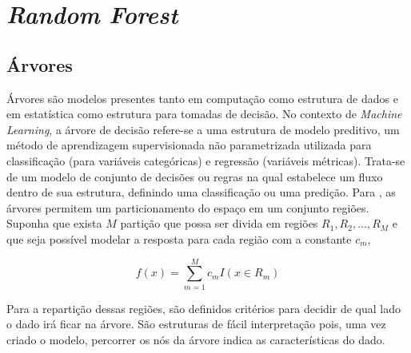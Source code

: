 \section{\emph{Random Forest}}


\subsection{Árvores}

Árvores são modelos presentes tanto em computação como estrutura de dados e em estatística como estrutura para tomadas de decisão. No contexto de \emph{Machine Learning}, a árvore de decisão refere-se a uma estrutura de modelo preditivo, um método de aprendizagem supervisionada não parametrizada utilizada para classificação (para variáveis categóricas) e regressão (variáveis métricas). Trata-se de um modelo de conjunto de decisões ou regras na qual estabelece um fluxo dentro de sua estrutura, definindo uma classificação ou uma predição. Para , as árvores permitem um particionamento do espaço em um conjunto regiões. Suponha que exista \begin{math}M\end{math} partição que possa ser divida em regiões \begin{math}R_{1}, R_{2}, ..., R_{M} \end{math} e que seja possível modelar a resposta para cada região com a constante \begin{math}c_{m}\end{math}, 

\begin{equation}
f(x) = \sum_{m=1}^{M}c_{m}I( x \in R_{m} )
\end{equation}

Para a repartição dessas regiões, são definidos critérios para decidir de qual lado o dado irá ficar na árvore. São estruturas de fácil interpretação pois, uma vez criado o modelo, percorrer os nós da árvore indica as características do dado.



